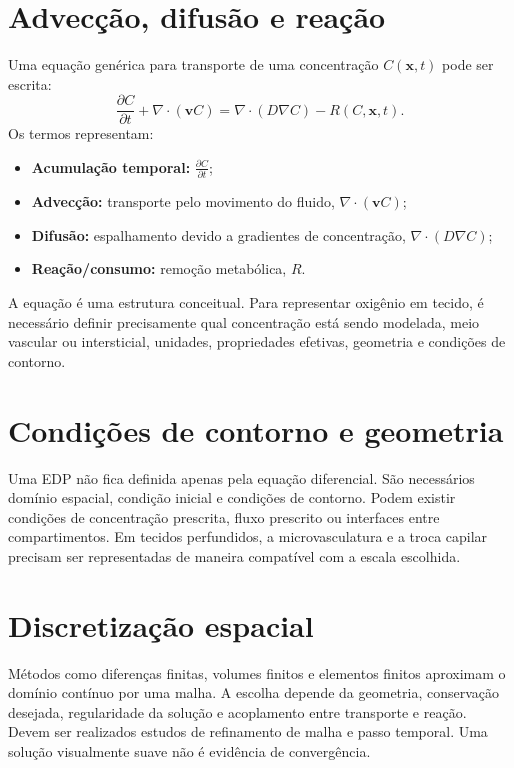 \documentclass[11pt,a4paper,oneside]{book}
\newcommand{\pder}[2]{\frac{\partial #1}{\partial #2}}
\begin{document}
\section{Advecção, difusão e reação}
Uma equação genérica para transporte de uma concentração $C(\bm{x},t)$ pode ser escrita:
\begin{equation}
  \pder{C}{t}+\nabla\cdot(\bm{v}C)
  =\nabla\cdot(D\nabla C)-R(C,\bm{x},t).
  \label{eq:advection-diffusion-reaction}
\end{equation}
Os termos representam:
\begin{itemize}
  \item \textbf{Acumulação temporal:} $\pder{C}{t}$;
  \item \textbf{Advecção:} transporte pelo movimento do fluido, $\nabla\cdot(\bm{v}C)$;
  \item \textbf{Difusão:} espalhamento devido a gradientes de concentração, $\nabla\cdot(D\nabla C)$;
  \item \textbf{Reação/consumo:} remoção metabólica, $R$.
\end{itemize}
A equação é uma estrutura conceitual. Para representar oxigênio em tecido, é necessário definir precisamente qual concentração está sendo modelada, meio vascular ou intersticial, unidades, propriedades efetivas, geometria e condições de contorno.

\section{Condições de contorno e geometria}
Uma EDP não fica definida apenas pela equação diferencial. São necessários domínio espacial, condição inicial e condições de contorno. Podem existir condições de concentração prescrita, fluxo prescrito ou interfaces entre compartimentos. Em tecidos perfundidos, a microvasculatura e a troca capilar precisam ser representadas de maneira compatível com a escala escolhida.

\section{Discretização espacial}
Métodos como diferenças finitas, volumes finitos e elementos finitos aproximam o domínio contínuo por uma malha. A escolha depende da geometria, conservação desejada, regularidade da solução e acoplamento entre transporte e reação. Devem ser realizados estudos de refinamento de malha e passo temporal. Uma solução visualmente suave não é evidência de convergência.
\end{document}
